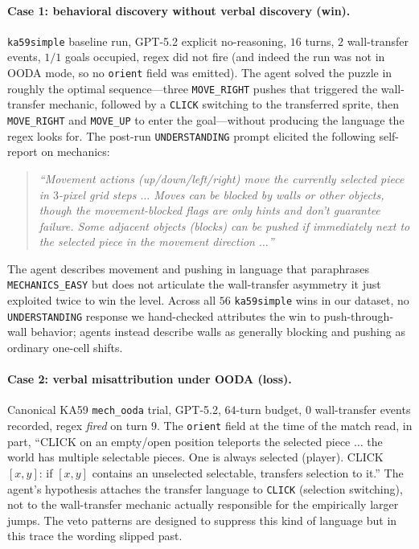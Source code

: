 \documentclass{article}
\begin{document}
\paragraph{Case 1: behavioral discovery without verbal discovery (win).}
\texttt{ka59simple} baseline run, GPT-5.2 explicit no-reasoning, $16$ turns, $2$ wall-transfer events, $1/1$ goals occupied, regex did not fire (and indeed the run was not in OODA mode, so no \texttt{orient} field was emitted). The agent solved the puzzle in roughly the optimal sequence---three \texttt{MOVE\_RIGHT} pushes that triggered the wall-transfer mechanic, followed by a \texttt{CLICK} switching to the transferred sprite, then \texttt{MOVE\_RIGHT} and \texttt{MOVE\_UP} to enter the goal---without producing the language the regex looks for. The post-run \texttt{UNDERSTANDING} prompt elicited the following self-report on mechanics:
\begin{quote}\itshape
``Movement actions (up/down/left/right) move the currently selected piece in $3$-pixel grid steps $\dots$ Moves can be blocked by walls or other objects, though the movement-blocked flags are only hints and don't guarantee failure. Some adjacent objects (blocks) can be pushed if immediately next to the selected piece in the movement direction $\dots$''
\end{quote}
The agent describes movement and pushing in language that paraphrases \texttt{MECHANICS\_EASY} but does not articulate the wall-transfer asymmetry it just exploited twice to win the level. Across all $56$ \texttt{ka59simple} wins in our dataset, no \texttt{UNDERSTANDING} response we hand-checked attributes the win to push-through-wall behavior; agents instead describe walls as generally blocking and pushing as ordinary one-cell shifts.

\paragraph{Case 2: verbal misattribution under OODA (loss).}
Canonical KA59 \texttt{mech\_ooda} trial, GPT-5.2, $64$-turn budget, $0$ wall-transfer events recorded, regex \emph{fired} on turn $9$. The \texttt{orient} field at the time of the match read, in part, ``CLICK on an empty/open position teleports the selected piece $\dots$ the world has multiple selectable pieces. One is always selected (player). CLICK $[x,y]$: if $[x,y]$ contains an unselected selectable, transfers selection to it.'' The agent's hypothesis attaches the transfer language to \texttt{CLICK} (selection switching), not to the wall-transfer mechanic actually responsible for the empirically larger jumps. The veto patterns are designed to suppress this kind of language but in this trace the wording slipped past.
\end{document}
